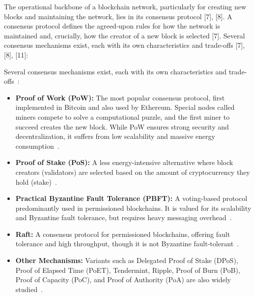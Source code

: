 \vspace{12pt}
\vspace{12pt}

The operational backbone of a blockchain network, particularly for creating new blocks and maintaining the network, lies in its consensus protocol [7], [8]. A consensus protocol defines the agreed-upon rules for how the network is maintained and, crucially, how the creator of a new block is selected [7].
Several consensus mechanisms exist, each with its own characteristics and trade-offs [7], [8], [11]:

Several consensus mechanisms exist, each with its own characteristics and trade-offs~\cite{khan2021challenges,zhou2020survey,aldoubaee2023review}:
\begin{itemize}
  \item \textbf{Proof of Work (PoW):} The most popular consensus protocol, first implemented in Bitcoin and also used by Ethereum. Special nodes called miners compete to solve a computational puzzle, and the first miner to succeed creates the new block. While PoW ensures strong security and decentralization, it suffers from low scalability and massive energy consumption~\cite{nakamoto2008bitcoin}.
  \item \textbf{Proof of Stake (PoS):} A less energy-intensive alternative where block creators (validators) are selected based on the amount of cryptocurrency they hold (stake)~\cite{buterin2014ethereum,zhou2020survey}.
  \item \textbf{Practical Byzantine Fault Tolerance (PBFT):} A voting-based protocol predominantly used in permissioned blockchains. It is valued for its scalability and Byzantine fault tolerance, but requires heavy messaging overhead~\cite{castro1999pbft}.
  \item \textbf{Raft:} A consensus protocol for permissioned blockchains, offering fault tolerance and high throughput, though it is not Byzantine fault-tolerant~\cite{ongaro2014raft}.
  \item \textbf{Other Mechanisms:} Variants such as Delegated Proof of Stake (DPoS), Proof of Elapsed Time (PoET), Tendermint, Ripple, Proof of Burn (PoB), Proof of Capacity (PoC), and Proof of Authority (PoA) are also widely studied~\cite{zhou2020survey}.
\end{itemize}

\vspace{12pt}


